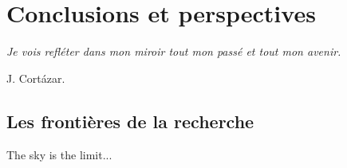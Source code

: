 \chapter{Conclusions et perspectives} \label{CONCL} \smallskip \hfill
\begin{minipage}[b]{8cm}
{\it Je vois refl\'eter dans mon miroir tout mon pass\'e et tout mon avenir.}
\end{minipage}
\begin{flushright} J. Cort\'azar. \end{flushright}
\bigskip


\bigskip

\section{Les fronti\`eres de la recherche}

The sky is the limit...
